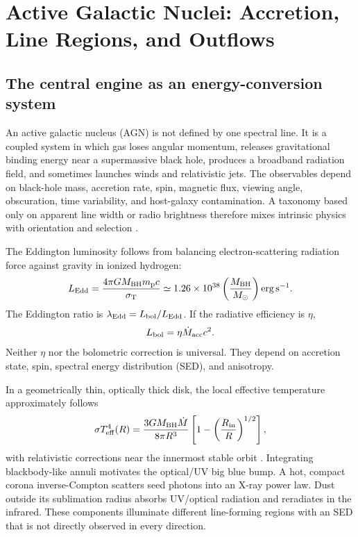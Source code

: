 \chapter{Active Galactic Nuclei: Accretion, Line Regions, and Outflows}
\label{chap:agn}

\section{The central engine as an energy-conversion system}

An active galactic nucleus (AGN) is not defined by one spectral line. It is a
coupled system in which gas loses angular momentum, releases gravitational
binding energy near a supermassive black hole, produces a broadband radiation
field, and sometimes launches winds and relativistic jets. The observables
depend on black-hole mass, accretion rate, spin, magnetic flux, viewing angle,
obscuration, time variability, and host-galaxy contamination. A taxonomy
based only on apparent line width or radio brightness therefore mixes
intrinsic physics with orientation and selection \citep{UrryPadovani1995}.

The Eddington luminosity follows from balancing electron-scattering radiation
force against gravity in ionized hydrogen:
\begin{equation}
 L_{\rm Edd}=\frac{4\pi GM_{\rm BH}m_{\rm p}c}{\sigma_{\rm T}}
 \simeq 1.26\times10^{38}
 \left(\frac{M_{\rm BH}}{M_\odot}\right)
 {\rm erg\,s^{-1}}.
 \label{eq:eddington}
\end{equation}
The Eddington ratio is $\lambda_{\rm Edd}=L_{\rm bol}/L_{\rm Edd}$. If the
radiative efficiency is $\eta$,
\begin{equation}
 L_{\rm bol}=\eta\dot{M}_{\rm acc}c^2.
 \label{eq:agn-accretion-luminosity}
\end{equation}
Neither $\eta$ nor the bolometric correction is universal. They depend on
accretion state, spin, spectral energy distribution (SED), and anisotropy.

In a geometrically thin, optically thick disk, the local effective temperature
approximately follows
\begin{equation}
 \sigma T_{\rm eff}^{4}(R)=
 \frac{3GM_{\rm BH}\dot{M}}{8\pi R^3}
 \left[1-\left(\frac{R_{\rm in}}{R}\right)^{1/2}\right],
 \label{eq:thin-disk}
\end{equation}
with relativistic corrections near the innermost stable orbit
\citep{ShakuraSunyaev1973}. Integrating blackbody-like annuli motivates the
optical/UV big blue bump. A hot, compact corona inverse-Compton scatters seed
photons into an X-ray power law. Dust outside its sublimation radius absorbs
UV/optical radiation and reradiates in the infrared. These components
illuminate different line-forming regions with an SED that is not directly
observed in every direction.

